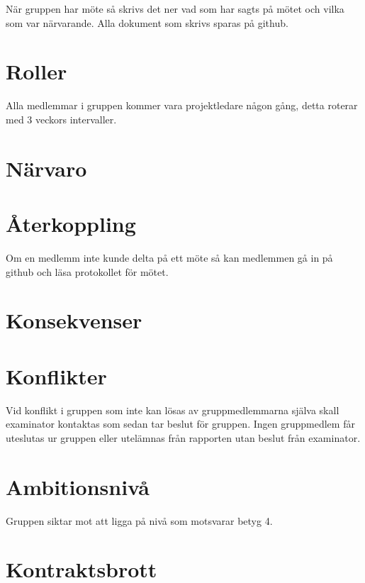 När gruppen har möte så skrivs det ner vad som har sagts på mötet och vilka som var närvarande. Alla dokument som skrivs sparas på github.

\section*{Roller}

Alla medlemmar i gruppen kommer vara projektledare någon gång, detta roterar med 3 veckors intervaller.

\section*{Närvaro}

\section*{Återkoppling}

Om en medlemm inte kunde delta på ett möte så kan medlemmen gå in på github och läsa protokollet för mötet. 

\section*{Konsekvenser}

\section*{Konflikter}


Vid konflikt i gruppen som inte kan lösas av gruppmedlemmarna själva skall examinator kontaktas som sedan tar beslut för gruppen.
Ingen gruppmedlem får uteslutas ur gruppen eller utelämnas från rapporten utan beslut från examinator.

\section*{Ambitionsnivå}

Gruppen siktar mot att ligga på nivå som motsvarar betyg 4.

\section*{Kontraktsbrott}

